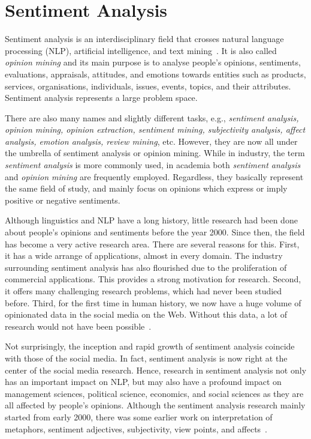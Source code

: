 \section{Sentiment Analysis}
\label{sec:analysis}

Sentiment analysis is an interdisciplinary field
that crosses natural language processing (NLP),
artificial intelligence, and text mining~\cite{Dri18}.
It is also called \emph{opinion mining} and its main purpose is
to analyse people's opinions, sentiments, evaluations, appraisals, attitudes, and emotions towards entities such as products, services,
organisations, individuals, issues, events, topics, and their attributes.
Sentiment analysis represents a large problem space.

There are also many names and slightly different tasks,
e.g., \emph{sentiment analysis, opinion mining, opinion extraction, sentiment mining, subjectivity analysis, affect analysis, emotion analysis,
review mining}, etc.
However, they are now all under the umbrella
of sentiment analysis or opinion mining.
While in industry, the term \emph{sentiment analysis} is more commonly used,
in academia both \emph{sentiment analysis}
and \emph{opinion mining} are frequently employed.
Regardless, they basically represent the same field of study,
and mainly focus on opinions
which express or imply positive or negative sentiments.

Although linguistics and NLP have a long history,
little research had been done about people's opinions and sentiments
before the year 2000.
Since then, the field has become a very active research area.
There are several reasons for this.
First, it has a wide arrange of applications, almost in every domain.
The industry surrounding sentiment analysis has also flourished
due to the proliferation of commercial applications.
This provides a strong motivation for research.
Second, it offers many challenging research problems,
which had never been studied before.
Third, for the first time in human history,
we now have a huge volume of opinionated data in the social media on the Web. Without this data, a lot of research would not have been possible~\cite{Liu12}.

Not surprisingly, the inception and rapid growth of sentiment analysis coincide with those of the social media.
In fact, sentiment analysis is now right at the center
of the social media research.
Hence, research in sentiment analysis not only has an important impact on NLP, but may also have a profound impact on management sciences,
political science, economics, and social sciences
as they are all affected by people's opinions.
Although the sentiment analysis research mainly started from early 2000,
there was some earlier work on interpretation of metaphors,
sentiment adjectives, subjectivity, view points, and affects~\cite{HM97,Hea92,WBO99}.

